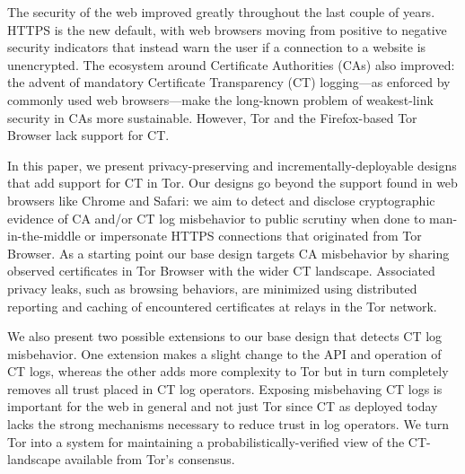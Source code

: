 The security of the web improved greatly throughout the last couple of years.
HTTPS is the new default, with web browsers moving from positive to
negative security indicators that instead warn the user if a connection to a
website is unencrypted.  The ecosystem around Certificate Authorities (CAs) also
improved:
	the advent of mandatory Certificate Transparency (CT) logging---as
	enforced by commonly used web browsers---make the long-known problem of
	weakest-link security in CAs more sustainable.
However, Tor and the Firefox-based Tor Browser lack support for CT.

\hspace{12pt}
In this paper, we present privacy-preserving and incrementally-deployable
designs that add support for CT in Tor. Our designs go beyond the
support found in web browsers like Chrome and Safari:
	we aim to detect and disclose cryptographic evidence of CA and/or
	CT log misbehavior to public scrutiny when done to man-in-the-middle or
	impersonate HTTPS connections that originated from Tor Browser\@.
As a starting point our base design targets CA misbehavior by sharing observed
certificates in Tor Browser with the wider CT landscape.  Associated privacy
leaks, such as browsing behaviors, are minimized using distributed reporting and
caching of encountered certificates at relays in the Tor network.


\hspace{12pt}
We also present two possible extensions to our base design that detects CT log
misbehavior. One extension makes a slight change to the API and operation
of CT logs, whereas the other adds more complexity to Tor but in turn completely
removes all trust placed in CT log operators.  Exposing misbehaving CT logs
is important for the web in general and not just Tor since CT as deployed today
lacks the strong mechanisms necessary to reduce trust in log operators.  We turn
Tor into a system for maintaining a probabilistically-verified view of the 
CT-landscape available from Tor’s consensus.
